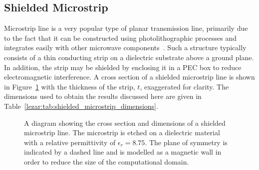 \subsection{Shielded Microstrip}
\label{lezar:sec:shielded_microstrip}
Microstrip line is a very popular type of planar transmission line,
primarily due to the fact that it can be constructed using
photolithographic processes and integrates easily with other microwave
components~\cite{Poz2005}. Such a structure typically consists of a
thin conducting strip on a dielectric substrate above a ground
plane. In addition, the strip may be shielded by enclosing it in a PEC
box to reduce electromagnetic interference. A cross section of a
shielded microstrip line is shown in
Figure~\ref{lezar:fig:shielded_microstrip} with the thickness of the strip,
$t$, exaggerated for clarity. The dimensions used to obtain the
results discussed here are given in
Table~\ref{lezar:tab:shielded_microstrip_dimensions}.
\begin{figure}[t]
    \centering
    \caption{A diagram showing the cross section and dimensions of a shielded microstrip line.  The microstrip is etched on a dielectric material with a relative permittivity of $\epsilon_r = 8.75$.  The plane of symmetry is indicated by a dashed line and is modelled as a magnetic wall in order to reduce the size of the computational domain.}
    \label{lezar:fig:shielded_microstrip}
\end{figure}

